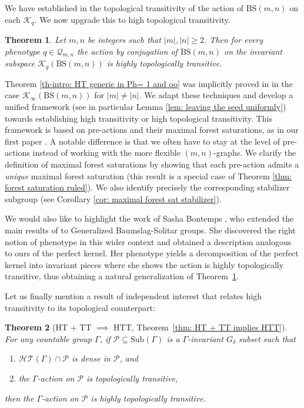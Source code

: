 \documentclass[12pt]{article}
\numberwithin{equation}{section}
\newtheorem{theoremintro}{Theorem}
\theoremstyle{definition}
\newcommand{\abs}[1]{\left\lvert #1\right\rvert}
\newcommand{\PK}{\mathcal{K}}
\newcommand{\QQ}{\mathcal{Q}}
\newcommand\BSo{\mathrm{BS}}
\newcommand{\Sub}{\mathrm{Sub}}
\begin{document}
We have established in \cite{CGLMS-22} the topological transitivity of the action of $\BSo(m,n)$ on each \(\PK_q\). We now upgrade this to high topological transitivity.

\begin{theoremintro}
	\label{th-intro: htt}
	Let \( m,n \) be integers such that \({\abs m}, \abs n\geq 2 \). 
	Then for every phenotype \(q\in \QQ_{m,n}\) 
	the action by conjugation of \( \BSo(m,n)  \) on the invariant subspace 
	\( \PK_q(\BSo(m,n))  \) is highly topologically transitive.
\end{theoremintro}


Theorem \ref{th-intro: HT generic in Ph= 1 and oo} was
implicitly proved in \cite[Theorem~4.4]{fima_characterization_HT_2022}
in the case $\PK_{\infty}(\BSo(m,n))$ for \(\abs{m}\neq\abs{n}\).
We adapt these techniques and develop a unified framework (see in particular Lemma \ref{lem: leaving the seed uniformly})
towards establishing high transitivity
or high topological transitivity.
This framework is based on pre-actions and their maximal forest saturations, as in our first paper \cite{CGLMS-22}.
A notable difference is that we often have to stay at the level of pre-actions instead of 
working with the more flexible \((m,n)\)-graphs.
We clarify the definition of maximal forest saturations by showing that 
each pre-action admits a \emph{unique} maximal forest saturation
(this result is a special case of Theorem \ref{thm: forest saturation ruled}).
We also identify precisely the corresponding stabilizer subgroup
(see Corollary \ref{cor: maximal forest sat stabilizer}).

We would also like to highlight the work of Sasha Bontemps \cite{Bontemps-pkGBS}, who extended 
the main results of \cite{CGLMS-22} to Generalized Baumslag-Solitar groups.
She discovered the right notion of phenotype in this wider context and obtained a description analogous to ours of the perfect kernel.
Her phenotype yields a decomposition of the perfect kernel into invariant pieces where she shows the action is highly topologically transitive, thus obtaining a natural generalization of
Theorem~\ref{th-intro: htt}.

Let us finally mention a result of independent interest that relates high transitivity to its topological counterpart:
\begin{theoremintro}[HT + TT $\implies$ HTT, 
Theorem~\ref{thm: HT + TT implies HTT}]\label{th-intro: ht + tt impl htt}
For any countable group $\Gamma$, 
if  $\mathcal P\subseteq \Sub(\Gamma)$ is a $\Gamma$-invariant 
$G_\delta$ subset such that 
\begin{enumerate}[label=(\arabic*)] 
	\item $\mathcal{HT}(\Gamma) \cap \mathcal P$ is dense in $\mathcal P$, and
	\item the $\Gamma$-action on $\mathcal P$ is topologically transitive,
\end{enumerate}
then  the $\Gamma$-action on $\mathcal P$ is highly topologically transitive.
\end{theoremintro}
\end{document}
